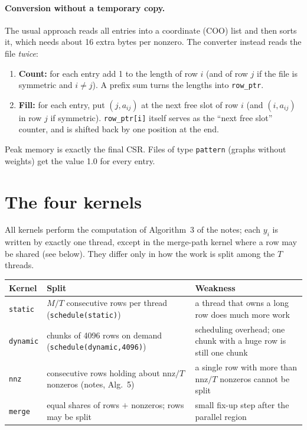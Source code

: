 \documentclass[11pt,a4paper]{article}
\begin{document}
\paragraph{Conversion without a temporary copy.} The usual approach reads all entries into
a coordinate (COO) list and then sorts it, which needs about 16 extra bytes per nonzero. The
converter instead reads the file \emph{twice}:
\begin{enumerate}
  \item \textbf{Count:} for each entry add 1 to the length of row $i$ (and of row $j$ if the
        file is symmetric and $i\ne j$). A prefix sum turns the lengths into
        \texttt{row\_ptr}.
  \item \textbf{Fill:} for each entry, put $(j, a_{ij})$ at the next free slot of row $i$
        (and $(i, a_{ij})$ in row $j$ if symmetric). \texttt{row\_ptr[i]} itself serves as
        the ``next free slot'' counter, and is shifted back by one position at the end.
\end{enumerate}
Peak memory is exactly the final CSR. Files of type \texttt{pattern} (graphs without
weights) get the value 1.0 for every entry.

\section{The four kernels}\label{sec:kernels}
All kernels perform the computation of Algorithm~3 of the notes; each $y_i$ is written by
exactly one thread, except in the merge-path kernel where a row may be shared (see below).
They differ only in how the work is split among the $T$ threads.

\begin{center}
\small
\begin{tabular}{@{}>{\raggedright\arraybackslash}p{2.1cm}>{\raggedright\arraybackslash}p{6.4cm}>{\raggedright\arraybackslash}p{6.4cm}@{}}
\toprule
Kernel & Split & Weakness \\ \midrule
\texttt{static} & $M/T$ consecutive rows per thread (\texttt{schedule(static)}) &
  a thread that owns a long row does much more work \\
\texttt{dynamic} & chunks of 4096 rows on demand (\texttt{schedule(dynamic,4096)}) &
  scheduling overhead; one chunk with a huge row is still one chunk \\
\texttt{nnz} & consecutive rows holding about nnz$/T$ nonzeros (notes, Alg.~5) &
  a single row with more than nnz$/T$ nonzeros cannot be split \\
\texttt{merge} & equal shares of rows $+$ nonzeros; rows may be split~\cite{merrill} &
  small fix-up step after the parallel region \\
\bottomrule
\end{tabular}
\end{center}
\end{document}
